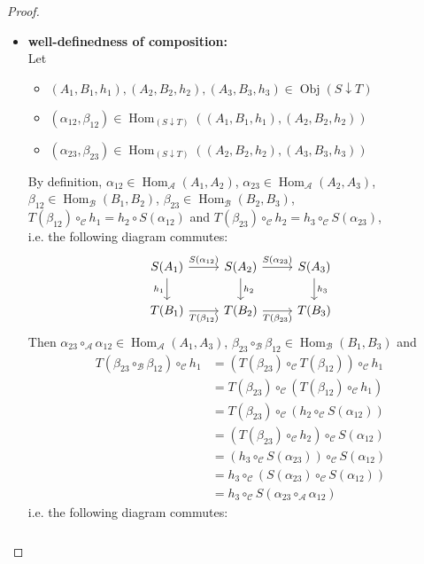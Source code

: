 \documentclass{book}
\theoremstyle{definition}
\newcommand{\al}{\alpha}
\newcommand{\be}{\beta}
\newcommand{\MA}{\mathcal{A}}
\newcommand{\MB}{\mathcal{B}}
\newcommand{\MC}{\mathcal{C}}
\DeclareMathOperator{\Obj}{Obj}
\DeclareMathOperator{\Hom}{Hom}
\DeclareMathOperator*{\0}{\mbf{0}}
\DeclareMathOperator*{\1}{\mbf{1}}
\begin{document}
	\begin{proof}\
		\begin{itemize}
			\item \textbf{well-definedness of composition:} \\
			Let 
			\begin{itemize}
				\item $(A_1, B_1, h_1), (A_2, B_2, h_2), (A_3, B_3, h_3) \in \Obj(S \downarrow T)$
				\item $(\al_{12}, \be_{12}) \in \Hom_{(S \downarrow T)}((A_1, B_1, h_1), (A_2, B_2, h_2))$ 
				\item $(\al_{23}, \be_{23}) \in \Hom_{(S \downarrow T)}((A_2, B_2, h_2), (A_3, B_3, h_3))$
			\end{itemize}
			By definition, $\al_{12} \in \Hom_{\MA}(A_1, A_2)$, $\al_{23} \in \Hom_{\MA}(A_2, A_3)$, $\be_{12} \in \Hom_{\MB}(B_1, B_2)$, $\be_{23} \in \Hom_{\MB}(B_2, B_3)$, $T(\be_{12}) \circ_{\MC} h_1 = h_2 \circ S(\al_{12})$ and $T(\be_{23}) \circ_{\MC} h_2 = h_3 \circ_{\MC} S(\al_{23})$, \\
			i.e. the following diagram commutes:
			\[ 
			\begin{tikzcd}
				S(A_1) \arrow[r, "S(\al_{12})"] \arrow[d, "h_1"'] & S(A_2)  \arrow[d, "h_2"] \arrow[r, "S(\al_{23})"] 
				& S(A_3) \arrow[d, "h_3"]\\
				T(B_1) \arrow[r, "T(\be_{12})"']                  & T(B_2)                   \arrow[r, "T(\be_{23})"'] 
				& T(B_3) 
			\end{tikzcd}
			\]
			Then $\al_{23} \circ_{\MA} \al_{12} \in \Hom_{\MA}(A_1, A_3)$, $\be_{23} \circ_{\MB} \be_{12} \in \Hom_{\MB}(B_1, B_3)$ and 
			\begin{align*}
				T(\be_{23} \circ_{\MB} \be_{12}) \circ_{\MC} h_1
				& = (T(\be_{23}) \circ_{\MC} T(\be_{12})) \circ_{\MC} h_1 \\
				& = T(\be_{23}) \circ_{\MC} (T(\be_{12}) \circ_{\MC} h_1) \\
				& = T(\be_{23}) \circ_{\MC} (h_2 \circ_{\MC} S(\al_{12})) \\
				& = (T(\be_{23}) \circ_{\MC} h_2) \circ_{\MC} S(\al_{12}) \\
				& = (h_3 \circ_{\MC} S(\al_{23})) \circ_{\MC} S(\al_{12}) \\
				& = h_3 \circ_{\MC} (S(\al_{23}) \circ_{\MC} S(\al_{12})) \\
				& = h_3 \circ_{\MC} S(\al_{23} \circ_{\MA} \al_{12})
			\end{align*}
			i.e. the following diagram commutes:
			\[ 
			\begin{tikzcd}

\end{tikzcd}\]
\end{itemize}
\end{proof}
\end{document}
